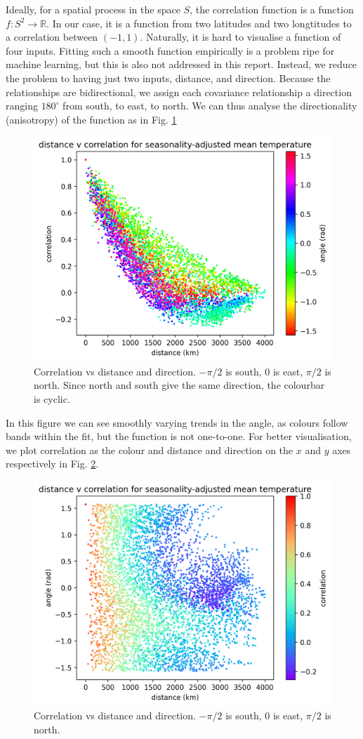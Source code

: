 \documentclass[12pt,a4paper]{article} %
\begin{document}
Ideally, for a spatial process in the space $S$, the correlation function is a function $f:S^2\to\mathbb{R}$. In our case, it is a function from two latitudes and two longtitudes to a correlation between $(-1,1)$. Naturally, it is hard to visualise a function of four inputs. Fitting such a smooth function empirically is a problem ripe for machine learning, but this is also not addressed in this report. Instead, we reduce the problem to having just two inputs, distance, and direction. Because the relationships are bidirectional, we assign each covariance relationship a direction ranging $180^\circ$ from south, to east, to north. We can thus analyse the directionality (anisotropy) of the function as in Fig. \ref{fig:anisotropy_1}
\begin{figure}[!ht]
    \centering
    \includegraphics[width=.8\linewidth]{mean_error_corr_by_dist_angle.png}
    \caption{Correlation vs distance and direction. $-\pi/2$ is south, $0$ is east, $\pi/2$ is north. Since north and south give the same direction, the colourbar is cyclic.}
    \label{fig:anisotropy_1}
\end{figure}
In this figure we can see smoothly varying trends in the angle, as colours follow bands within the fit, but the function is not one-to-one. For better visualisation, we plot correlation as the colour and distance and direction on the $x$ and $y$ axes respectively in Fig. \ref{fig:anisotropy_2}.
\begin{figure}[!ht]
    \centering
    \includegraphics[width=.8\linewidth]{mean_error_corr_by_dist_angle_2.png}
    \caption{Correlation vs distance and direction. $-\pi/2$ is south, $0$ is east, $\pi/2$ is north.}
    \label{fig:anisotropy_2}
\end{figure}
\end{document}
